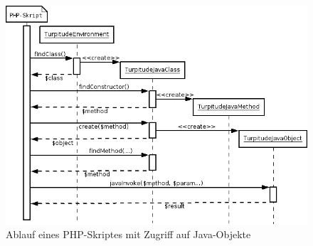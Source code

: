\begin{figure}[h]
\includegraphics[width=\textwidth]{chap1/img/phpseq.png}
\caption{Ablauf eines PHP-Skriptes mit Zugriff auf Java-Objekte}
\label{fig:phpseq}
\end{figure}




